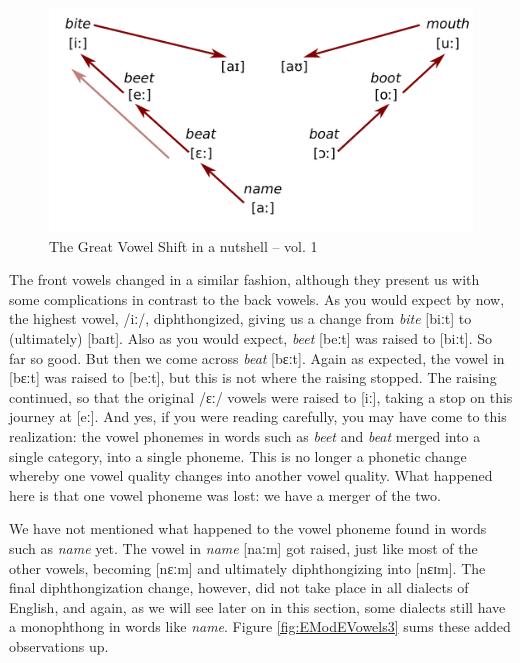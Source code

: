 \begin{figure}
        \includegraphics[height=.25\textheight]{chapters/img/EModEVowels2a.pdf}
    \caption{The Great Vowel Shift in a nutshell -- vol. 1}
    \label{fig:EModEVowels2}
\end{figure}

The front vowels changed in a similar fashion, although they present us with some complications in contrast to the back vowels. As you would expect by now, the highest vowel, /iː/, diphthongized, giving us a change from \textit{bite} [biːt] to (ultimately) [baɪt]. Also as you would expect, \textit{beet} [beːt] was raised to [biːt]. So far so good. But then we come across \textit{beat} [bɛːt]. Again as expected, the vowel in [bɛːt] was raised to [beːt], but this is not where the raising stopped. The raising continued, so that the original /ɛː/ vowels were raised to [iː], taking a stop on this journey at [eː]. And yes, if you were reading carefully, you may have come to this realization: the vowel phonemes in words such as \textit{beet} and \textit{beat} merged into a single category, into a single phoneme. This is no longer a phonetic change whereby one vowel quality changes into another vowel quality. What happened here is that one vowel phoneme was lost: we have a merger of the two.

We have not mentioned what happened to the vowel phoneme found in words such as \textit{name} yet. The vowel in \textit{name} [naːm] got raised, just like most of the other vowels, becoming [nɛːm] and ultimately diphthongizing into [nɛɪm]. The final diphthongization change, however, did not take place in all dialects of English, and again, as we will see later on in this section, some dialects still have a monophthong in words like \textit{name}. Figure \ref{fig:EModEVowels3} sums these added observations up.

